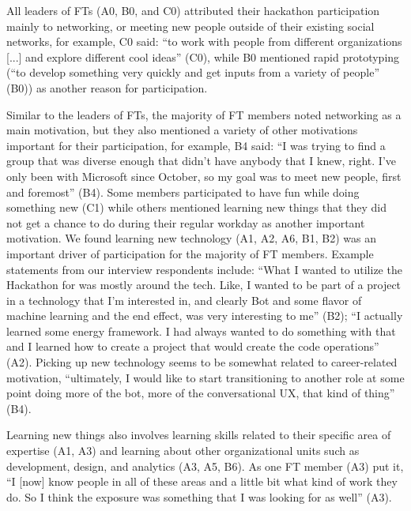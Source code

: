 \documentclass{hcij}
\begin{document}
All leaders of FTs (A0, B0, and C0) attributed their hackathon participation mainly to networking, or meeting new people outside of their existing social networks, for example, C0 said: “to work with people from different organizations [...] and explore different cool ideas” (C0), while B0 mentioned rapid prototyping (“to develop something very quickly and get inputs from a variety of people” (B0)) as another reason for participation.

Similar to the leaders of FTs, the majority of FT members noted networking as a main motivation, but they also mentioned a variety of other motivations important for their participation, for example, B4 said: “I was trying to find a group that was diverse enough that didn't have anybody that I knew, right. I've only been with Microsoft since October, so my goal was to meet new people, first and foremost” (B4). Some members participated to have fun while doing something new (C1) while others mentioned learning new things that they did not get a chance to do during their regular workday as another important motivation. We found learning new technology (A1, A2, A6, B1, B2) was an important driver of participation for the majority of FT members. Example statements from our interview respondents include: “What I wanted to utilize the Hackathon for was mostly around the tech. Like, I wanted to be part of a project in a technology that I'm interested in, and clearly Bot and some flavor of machine learning and the end effect, was very interesting to me” (B2); “I actually learned some energy framework. I had always wanted to do something with that and I learned how to create a project that would create the code operations” (A2). Picking up new technology seems to be somewhat related to career-related motivation, “ultimately, I would like to start transitioning to another role at some point doing more of the bot, more of the conversational UX, that kind of thing” (B4).

Learning new things also involves learning skills related to their specific area of expertise (A1, A3) and learning about other organizational units such as development, design, and analytics (A3, A5, B6). As one FT member (A3) put it, “I [now] know people in all of these areas and a little bit what kind of work they do. So I think the exposure was something that I was looking for as well” (A3).
\end{document}
